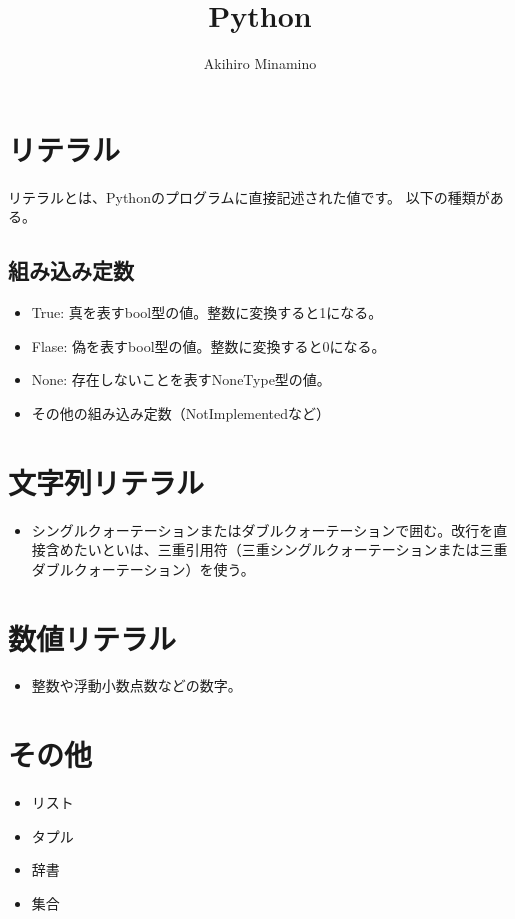 \documentclass[11pt, oneside]{article}   	%
\title{Python}
\author{Akihiro Minamino}
\begin{document}
\maketitle
\section{リテラル}
リテラルとは、Pythonのプログラムに直接記述された値です。
以下の種類がある。

\subsection{組み込み定数}
\begin{itemize}
\item True: 真を表すbool型の値。整数に変換すると1になる。
\item Flase: 偽を表すbool型の値。整数に変換すると0になる。
\item None: 存在しないことを表すNoneType型の値。
\item その他の組み込み定数（NotImplementedなど）
\end{itemize}

\section{文字列リテラル}
\begin{itemize}
\item シングルクォーテーションまたはダブルクォーテーションで囲む。改行を直接含めたいといは、三重引用符（三重シングルクォーテーションまたは三重ダブルクォーテーション）を使う。
\end{itemize}

\section{数値リテラル}
\begin{itemize}
\item 整数や浮動小数点数などの数字。
\end{itemize}

\section{その他}
\begin{itemize}
\item リスト
\item タプル
\item 辞書
\item 集合
\end{itemize}
\end{document}

